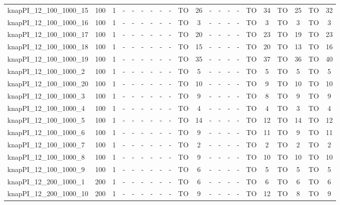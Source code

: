 \begin{sidewaystable}[!ht]
{\begin{tabular}{lcccccccccccccccccccc}
knapPI\_12\_100\_1000\_15 & 100 & 1 &  - &  - &  - &  - &  - &  - & TO & 26 &  - &  - &  - &  - & TO & 34 & TO & 25 & TO & 32 \\
knapPI\_12\_100\_1000\_16 & 100 & 1 &  - &  - &  - &  - &  - &  - & TO & 3 &  - &  - &  - &  - & TO & 3 & TO & 3 & TO & 3 \\
knapPI\_12\_100\_1000\_17 & 100 & 1 &  - &  - &  - &  - &  - &  - & TO & 20 &  - &  - &  - &  - & TO & 23 & TO & 19 & TO & 23 \\
knapPI\_12\_100\_1000\_18 & 100 & 1 &  - &  - &  - &  - &  - &  - & TO & 15 &  - &  - &  - &  - & TO & 20 & TO & 13 & TO & 16 \\
knapPI\_12\_100\_1000\_19 & 100 & 1 &  - &  - &  - &  - &  - &  - & TO & 35 &  - &  - &  - &  - & TO & 37 & TO & 36 & TO & 40 \\
knapPI\_12\_100\_1000\_2 & 100 & 1 &  - &  - &  - &  - &  - &  - & TO & 5 &  - &  - &  - &  - & TO & 5 & TO & 5 & TO & 5 \\
knapPI\_12\_100\_1000\_20 & 100 & 1 &  - &  - &  - &  - &  - &  - & TO & 10 &  - &  - &  - &  - & TO & 9 & TO & 10 & TO & 10 \\
knapPI\_12\_100\_1000\_3 & 100 & 1 &  - &  - &  - &  - &  - &  - & TO & 9 &  - &  - &  - &  - & TO & 8 & TO & 9 & TO & 9 \\
knapPI\_12\_100\_1000\_4 & 100 & 1 &  - &  - &  - &  - &  - &  - & TO & 4 &  - &  - &  - &  - & TO & 4 & TO & 3 & TO & 4 \\
knapPI\_12\_100\_1000\_5 & 100 & 1 &  - &  - &  - &  - &  - &  - & TO & 14 &  - &  - &  - &  - & TO & 12 & TO & 14 & TO & 12 \\
knapPI\_12\_100\_1000\_6 & 100 & 1 &  - &  - &  - &  - &  - &  - & TO & 9 &  - &  - &  - &  - & TO & 11 & TO & 9 & TO & 11 \\
knapPI\_12\_100\_1000\_7 & 100 & 1 &  - &  - &  - &  - &  - &  - & TO & 2 &  - &  - &  - &  - & TO & 2 & TO & 2 & TO & 2 \\
knapPI\_12\_100\_1000\_8 & 100 & 1 &  - &  - &  - &  - &  - &  - & TO & 9 &  - &  - &  - &  - & TO & 10 & TO & 10 & TO & 10 \\
knapPI\_12\_100\_1000\_9 & 100 & 1 &  - &  - &  - &  - &  - &  - & TO & 6 &  - &  - &  - &  - & TO & 5 & TO & 5 & TO & 5 \\
knapPI\_12\_200\_1000\_1 & 200 & 1 &  - &  - &  - &  - &  - &  - & TO & 6 &  - &  - &  - &  - & TO & 6 & TO & 6 & TO & 6 \\
knapPI\_12\_200\_1000\_10 & 200 & 1 &  - &  - &  - &  - &  - &  - & TO & 9 &  - &  - &  - &  - & TO & 12 & TO & 8 & TO & 9 \\

\end{tabular}}
\end{sidewaystable}
